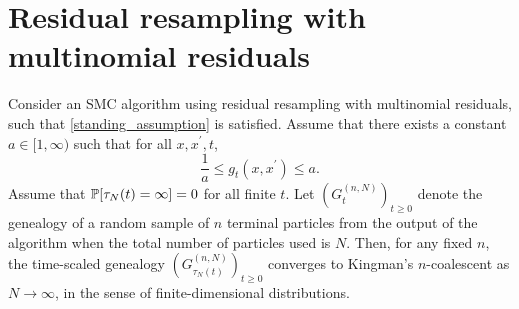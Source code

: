 \section{Residual resampling with multinomial residuals \seb{$\sim$} }

\begin{corollary}\label{thm:residual_multinomial}
Consider an SMC algorithm using residual resampling with multinomial residuals, such that \ref{standing_assumption} is satisfied.
Assume that there exists a constant $a\in [1,\infty)$ such that for all $x, x^\prime, t$,
\begin{equation*}
\frac{1}{a} \leq g_t(x, x^\prime) \leq a .
\end{equation*}
Assume that $\mathbb{P}[ \tau_N(t) = \infty] =0$ for all finite $t$.
Let $(G_t^{(n,N)})_{t\geq0}$ denote the genealogy of a random sample of $n$ terminal particles from the output of the algorithm when the total number of particles used is $N$. Then, for any fixed $n$, the time-scaled genealogy $(G_{\tau_N(t)}^{(n,N)})_{t\geq0}$ converges to Kingman's $n$-coalescent as $N\to \infty$, in the sense of finite-dimensional distributions.
\end{corollary}

